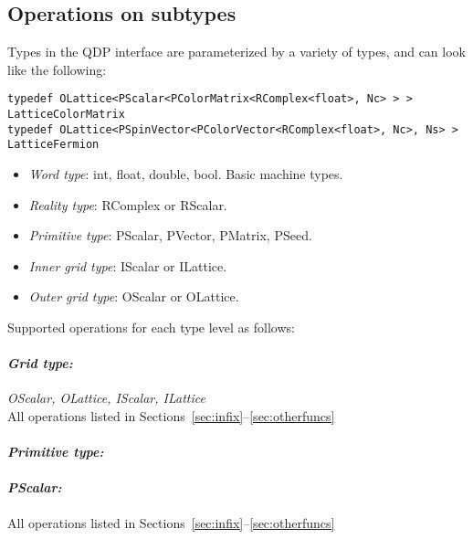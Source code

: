\documentclass[12pt,letterpaper]{article}
\begin{document}
\bigskip

\subsection{Operations on subtypes}

Types in the QDP interface are parameterized by a variety of types, and
can look like the following:

\begin{small}
\begin{verbatim}
typedef OLattice<PScalar<PColorMatrix<RComplex<float>, Nc> > > LatticeColorMatrix
typedef OLattice<PSpinVector<PColorVector<RComplex<float>, Nc>, Ns> > LatticeFermion
\end{verbatim}
\end{small}

\begin{itemize}
\item {\em Word type}: 
  int, float, double, bool. Basic machine types.
\item {\em Reality type}: 
  RComplex or RScalar. 
\item {\em Primitive type}: 
  PScalar, PVector, PMatrix, PSeed. 
\item {\em Inner grid type}: 
  IScalar or ILattice. 
\item {\em Outer grid type}:
  OScalar or OLattice. 
\end{itemize}

\noindent
Supported operations for each type level as follows:

\paragraph{\bf\em Grid type:} {\em OScalar, OLattice, IScalar, ILattice}\\
All operations listed in Sections~\ref{sec:infix}--\ref{sec:otherfuncs}

\paragraph{\bf\em Primitive type:}
\paragraph{\bf\em PScalar:}
All operations listed in Sections~\ref{sec:infix}--\ref{sec:otherfuncs}

\end{document}
